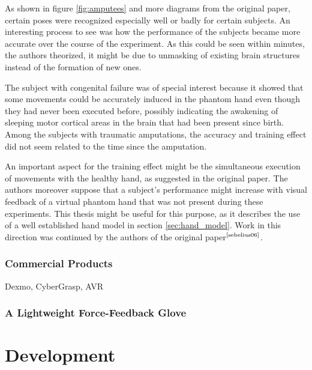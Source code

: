 \documentclass[hyperref, bachelorofscience]{cgvpub}
\newcommand{\newcite}[1]{$ ^{\text{\cite{#1}}} $}
\begin{document}
As shown in figure \ref{fig:amputees} and more diagrams from the original paper, certain poses were recognized especially well or badly for certain subjects. An interesting process to see was how the performance of the subjects became more accurate over the course of the experiment. As this could be seen within minutes, the authors theorized, it might be due to unmasking of existing brain structures instead of the formation of new ones. 

The subject with congenital failure was of special interest because it showed that some movements could be accurately induced in the phantom hand even though they had never been executed before, possibly indicating the awakening of sleeping motor cortical areas in the brain that had been present since birth. Among the subjects with traumatic amputations, the accuracy and training effect did not seem related to the time since the amputation.

An important aspect for the training effect might be the simultaneous execution of movements with the healthy hand, as suggested in the original paper. The authors moreover suppose that a subject's performance might increase with visual feedback of a virtual phantom hand that was not present during these experiments. This thesis might be useful for this purpose, as it describes the use of a well established hand model in section \ref{sec:hand_model}. Work in this direction was continued by the authors of the original paper\newcite{sebelius06}.

\subsection{Commercial Products}
Dexmo, CyberGrasp, \Gls{AVR}

\subsection{A Lightweight Force-Feedback Glove}

\chapter{Development}
\end{document}
